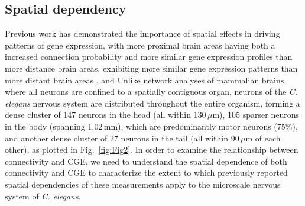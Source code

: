 \documentclass[10pt,letterpaper]{article}
\begin{document}
\subsection*{Spatial dependency}
Previous work has demonstrated the importance of spatial effects in driving patterns of gene expression, with more proximal brain areas \cite{Horvat:2016ia, Wang:2016gg, Markov:2013jo, Henderson:2014fg, Fulcher:2016ck, Noori:2017ce, Levy:2012dy, Azulay:2016cg} having both a increased connection probability and more similar gene expression profiles \cite{Krienen:2016eq, Fulcher:2016ck, Pantazatos:2017ix, Richiardi:2017hb} than more distance brain areas.
 exhibiting more similar gene expression patterns than more distant brain areas , and
Unlike network analyses of mammalian brains, where all neurons are confined to a spatially contiguous organ, neurons of the \emph{C. elegans} nervous system are distributed throughout the entire organism, forming a dense cluster of 147 neurons in the head (all within 130\,$\mu$m), 105 sparser neurons in the body (spanning 1.02\,mm), which are predominantly motor neurons (75\%), and another dense cluster of 27 neurons in the tail (all within 90\,$\mu$m of each other), as plotted in Fig.~\ref{fig:Fig2}.
In order to examine the relationship between connectivity and CGE, we need to understand the spatial dependence of both connectivity and CGE to characterize the extent to which previously reported spatial dependencies of these measurements apply to the microscale nervous system of \emph{C. elegans}.

\end{document}
